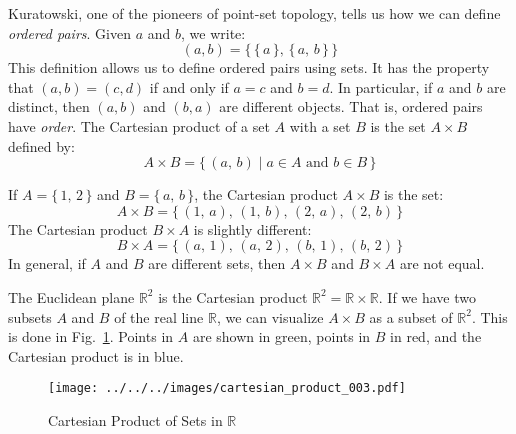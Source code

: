 \documentclass{article}
\theoremstyle{plain}
\theoremstyle{normal}
\newenvironment{example}{%
    \pushQED{\qed}\renewcommand{\qedsymbol}{$\blacksquare$}\examplex%
}{%
    \popQED\endexamplex%
}
\newenvironment{definition}{%
    \pushQED{\qed}\renewcommand{\qedsymbol}{$\blacksquare$}\definitionx%
}{%
    \popQED\enddefinitionx%
}
\begin{document}
        Kuratowski, one of the pioneers of point-set topology, tells us how
        we can define \textit{ordered pairs}. Given $a$ and $b$, we write:
        \begin{equation}
            (a,b)=\big\{\,\{\,a\,\},\,\{\,a,\,b\,\}\,\big\}
        \end{equation}
        This definition allows us to define ordered pairs using sets. It has
        the property that $(a,b)=(c,d)$ if and only if $a=c$ and $b=d$. In
        particular, if $a$ and $b$ are distinct, then $(a,b)$ and $(b,a)$ are
        different objects. That is, ordered pairs have \textit{order}.
        \begin{definition}[\textbf{Cartesian Product}]
            The Cartesian product of a set $A$ with a set $B$ is the set
            $A\times{B}$ defined by:
            \begin{equation}
                A\times{B}=\{\,(a,\,b)\;|\;a\in{A}\textrm{ and }b\in{B}\,\}
            \end{equation}
        \end{definition}
        \begin{example}
            If $A=\{\,1,\,2\,\}$ and $B=\{\,a,\,b\,\}$, the Cartesian product
            $A\times{B}$ is the set:
            \begin{equation}
                A\times{B}=\{\,(1,\,a),\,(1,\,b),\,(2,\,a),\,(2,\,b)\,\}
            \end{equation}
            The Cartesian product $B\times{A}$ is slightly different:
            \begin{equation}
                B\times{A}=\{\,(a,\,1),\,(a,\,2),\,(b,\,1),\,(b,\,2)\,\}
            \end{equation}
            In general, if $A$ and $B$ are different sets, then $A\times{B}$
            and $B\times{A}$ are not equal.
        \end{example}
        \begin{example}
            The Euclidean plane $\mathbb{R}^{2}$ is the Cartesian product
            $\mathbb{R}^{2}=\mathbb{R}\times\mathbb{R}$.
        \end{example}
        If we have two subsets $A$ and $B$ of the real line $\mathbb{R}$, we
        can visualize $A\times{B}$ as a subset of $\mathbb{R}^{2}$.
        This is done in Fig.~\ref{fig:cartesian_product_003}. Points in $A$ are
        shown in green, points in $B$ in red, and the Cartesian product is in
        blue.
        \begin{figure}
            \centering
            \texttt{[image: ../../../images/cartesian\_product\_003.pdf]}
            \caption{Cartesian Product of Sets in $\mathbb{R}$}
            \label{fig:cartesian_product_003}
        \end{figure}
\end{document}
